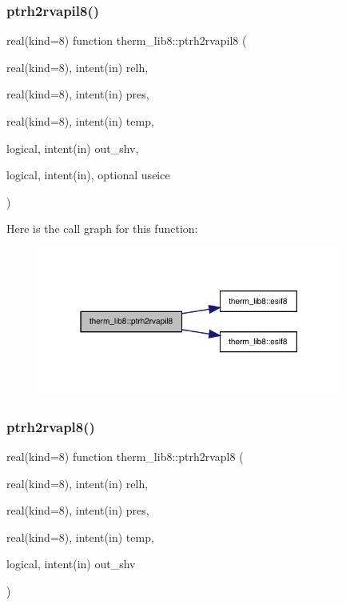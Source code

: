 \subsubsection{\texorpdfstring{ptrh2rvapil8()}{ptrh2rvapil8()}}
{\footnotesize\ttfamily real(kind=8) function therm\+\_\+lib8\+::ptrh2rvapil8 (\begin{DoxyParamCaption}\item[{real(kind=8), intent(in)}]{relh,  }\item[{real(kind=8), intent(in)}]{pres,  }\item[{real(kind=8), intent(in)}]{temp,  }\item[{logical, intent(in)}]{out\+\_\+shv,  }\item[{logical, intent(in), optional}]{useice }\end{DoxyParamCaption})}

Here is the call graph for this function\+:
\nopagebreak
\begin{figure}[H]
\begin{center}
\leavevmode
\includegraphics[width=283pt]{namespacetherm__lib8_a8ad59ba9abc05562f0c90d7ef6a8bca8_cgraph}
\end{center}
\end{figure}
\mbox{\label{namespacetherm__lib8_a1369aae8fe00b751c008902b167f212b}} 
\subsubsection{\texorpdfstring{ptrh2rvapl8()}{ptrh2rvapl8()}}
{\footnotesize\ttfamily real(kind=8) function therm\+\_\+lib8\+::ptrh2rvapl8 (\begin{DoxyParamCaption}\item[{real(kind=8), intent(in)}]{relh,  }\item[{real(kind=8), intent(in)}]{pres,  }\item[{real(kind=8), intent(in)}]{temp,  }\item[{logical, intent(in)}]{out\+\_\+shv }\end{DoxyParamCaption})}

